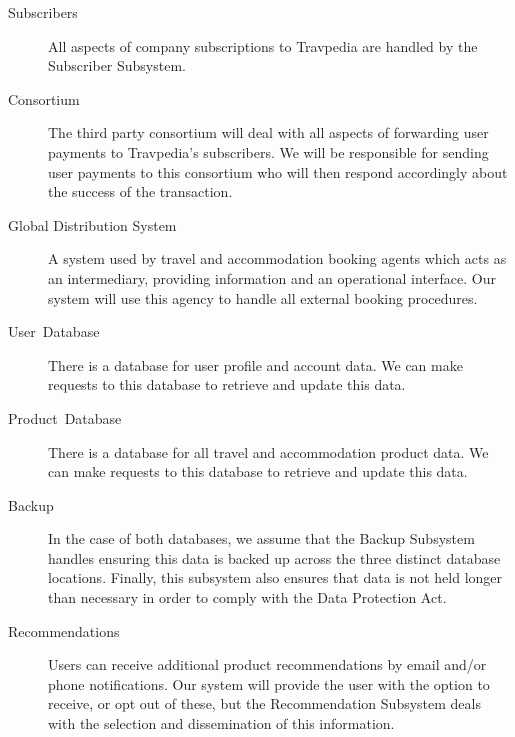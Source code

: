 \begin{description}
	\item [{Subscribers}] All aspects of company subscriptions to Travpedia
		are handled by the Subscriber Subsystem.
	\item [{Consortium}] The third party consortium will deal with all aspects
		of forwarding user payments to Travpedia's subscribers. We will be
		responsible for sending user payments to this consortium who will then
		respond accordingly about the success of the transaction.
	\item [{Global Distribution System}] A system used by travel and
		accommodation booking agents which acts as an intermediary, providing
		information and an operational interface. Our system will use this
		agency to handle all external booking procedures.
	\item [{User~Database}] There is a database for user profile and account
		data. We can make requests to this database to retrieve and update
		this data.
	\item [{Product~Database}] There is a database for all travel and
		accommodation product data. We can make requests to this database to
		retrieve and update this data.
	\item [{Backup}] In the case of both databases, we assume that the Backup
		Subsystem handles ensuring this data is backed up across the three
		distinct database locations. Finally, this subsystem also ensures that
		data is not held longer than necessary in order to comply with the Data
		Protection Act.
	\item [{Recommendations}] Users can receive additional product
		recommendations by email and/or phone notifications. Our system will
		provide the user with the option to receive, or opt out of these, but
		the Recommendation Subsystem deals with the selection and dissemination
		of this information.
\end{description}
